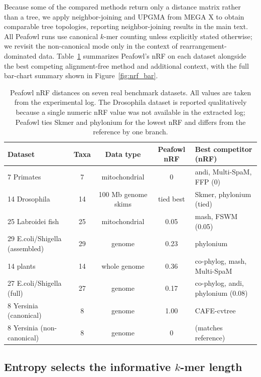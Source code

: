 \documentclass[11pt]{article}
\begin{document}
Because some of the compared methods return only a distance matrix rather
than a tree, we apply neighbor-joining \citep{saitou1987nj} and UPGMA
\citep{sokal1958upgma} from MEGA X \citep{kumar2018megax} to obtain
comparable tree topologies, reporting neighbor-joining results in the main
text. All Peafowl runs use canonical $k$-mer counting unless explicitly
stated otherwise; we revisit the non-canonical mode only in the context of
rearrangement-dominated data. Table~\ref{tab:main_results} summarizes
Peafowl's nRF on each dataset alongside the best competing alignment-free
method and additional context, with the full bar-chart summary shown in
Figure~\ref{fig:nrf_bar}.

\begin{table}[htbp]
\centering
\caption{Peafowl nRF distances on seven real benchmark datasets. All values
are taken from the experimental log. The Drosophila dataset is reported
qualitatively because a single numeric nRF value was not available in the
extracted log; Peafowl ties Skmer and phylonium for the lowest nRF and
differs from the reference by one branch.}
\label{tab:main_results}
\begin{tabular}{lcccl}
\toprule
Dataset & Taxa & Data type & Peafowl nRF & Best competitor (nRF) \\
\midrule
7 Primates & 7 & mitochondrial & 0 & andi, Multi-SpaM, FFP (0) \\
14 Drosophila & 14 & 100 Mb genome skims & tied best & Skmer, phylonium (tied) \\
25 Labroidei fish & 25 & mitochondrial & 0.05 & mash, FSWM (0.05) \\
29 E.coli/Shigella (assembled) & 29 & genome & 0.23 & phylonium \\
14 plants & 14 & whole genome & 0.36 & co-phylog, mash, Multi-SpaM \\
27 E.coli/Shigella (full) & 27 & genome & 0.17 & co-phylog, andi, phylonium (0.08) \\
8 Yersinia (canonical) & 8 & genome & 1.00 & CAFE-cvtree \\
8 Yersinia (non-canonical) & 8 & genome & 0 & (matches reference) \\
\bottomrule
\end{tabular}
\end{table}

\subsection{Entropy selects the informative $k$-mer length}
\end{document}
